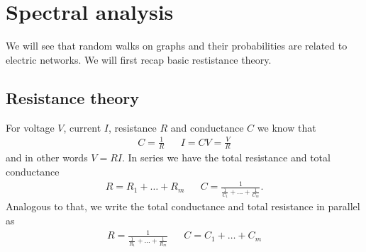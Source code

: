 \section{Spectral analysis}
\bigskip

We will see that random walks on graphs and their probabilities are related to electric networks. We will first recap basic restistance theory.

\subsection{Resistance theory}
\bigskip

For voltage $V$, current $I$, resistance $R$ and conductance $C$ we know that
\begin{align*}
    C = \frac{1}{R} && I = CV = \frac{V}{R}
\end{align*}
and in other words $V = RI$. In series we have the total resistance and total conductance
\begin{align*}
    R = R_1 + \ldots + R_m && C = \frac{1}{\frac{1}{C_1} + \ldots + \frac{1}{C_m}}.
\end{align*}
Analogous to that, we write the total conductance and total resistance in parallel as
\begin{align*}
    R = \frac{1}{\frac{1}{R_1} + \ldots + \frac{1}{R_m}} && C = C_1 + \ldots + C_m
\end{align*}

